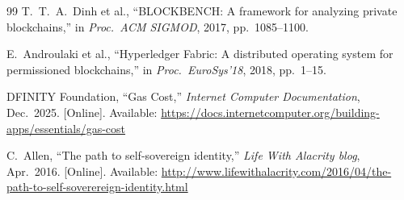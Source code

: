 \documentclass[conference,a4paper]{IEEEtran}
\begin{document}
\begin{thebibliography}{99}
T.~T.~A.~Dinh et al.,
``BLOCKBENCH: A framework for analyzing private blockchains,''
in \textit{Proc.\ ACM SIGMOD}, 2017, pp.~1085--1100.

E.~Androulaki et al.,
``Hyperledger Fabric: A distributed operating system for permissioned blockchains,''
in \textit{Proc.\ EuroSys'18}, 2018, pp.~1--15.

DFINITY Foundation,
``Gas Cost,'' \textit{Internet Computer Documentation}, Dec.\ 2025.
[Online]. Available: \url{https://docs.internetcomputer.org/building-apps/essentials/gas-cost}

C.~Allen,
``The path to self-sovereign identity,''
\textit{Life With Alacrity blog}, Apr.~2016.
[Online]. Available: \url{http://www.lifewithalacrity.com/2016/04/the-path-to-self-soverereign-identity.html}

\end{thebibliography}
\end{document}
